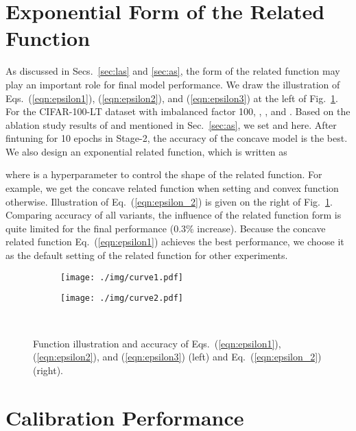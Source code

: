 \documentclass[final]{cvpr}
\begin{document}
	\section{Exponential Form of the Related Function }\label{sec:as_form}
	As discussed in Secs.~\ref{sec:las} and \ref{sec:as}, the form of the related function  may play an important role for final model performance. We draw the illustration of Eqs.~(\ref{eqn:epsilon1}), (\ref{eqn:epsilon2}), and (\ref{eqn:epsilon3}) at the left of Fig.~\ref{fig:ab_curve}. For the CIFAR-100-LT dataset with imbalanced factor 100, , , and . Based on the ablation study results of  and  mentioned in Sec.~\ref{sec:as}, we set  and  here. After fintuning for 10 epochs in Stage-2, the accuracy of the concave model is the best. We also design an exponential related function, which is written as
	
	where  is a hyperparameter to control the shape of the related function. For example, we get the concave related function when setting  and convex function otherwise. Illustration of Eq.~(\ref{eqn:epsilon_2}) is given on the right of Fig.~\ref{fig:ab_curve}. Comparing accuracy of all variants, the influence of the related function form is quite limited for the final performance (0.3\% increase). Because the concave related function Eq.~(\ref{eqn:epsilon1}) achieves the best performance, we choose it as the default setting of the related function  for other experiments.
	\begin{figure}[h]
		\begin{subfigure}{0.495\linewidth}
			\centering
			\texttt{[image: ./img/curve1.pdf]}
		\end{subfigure}
		\hfill
		\begin{subfigure}{0.495\linewidth}
			\centering
			\texttt{[image: ./img/curve2.pdf]}
		\end{subfigure} \\
		
		\caption{Function illustration and accuracy of Eqs.~(\ref{eqn:epsilon1}), (\ref{eqn:epsilon2}), and (\ref{eqn:epsilon3}) (left) and Eq.~(\ref{eqn:epsilon_2}) (right).}
		\label{fig:ab_curve}
	\end{figure}
	
	\clearpage
	\section{Calibration Performance}\label{sec:cb}
	
\end{document}
